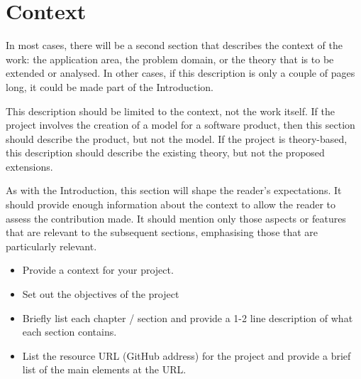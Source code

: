 \chapter{Context}
In most cases, there will be a second section that describes the context of the work: the application area, the problem domain, or the theory that is to be extended or analysed. In other cases, if this description is only a couple of pages long, it could be made part of the Introduction.

This description should be limited to the context, not the work itself. If the project involves the creation of a model for a software product, then this section should describe the product, but not the model. If the project is theory-based, this description should describe the existing theory, but not the proposed extensions.

As with the Introduction, this section will shape the reader's expectations. It should provide enough information about the context to allow the reader to assess the contribution made. It should mention only those aspects or features that are relevant to the subsequent sections, emphasising those that are particularly relevant.

\begin{itemize}
\item Provide a context for your project.
\item Set out the objectives of the project
\item Briefly list each chapter / section and provide a 1-2 line description of what each section contains.
\item List the resource URL (GitHub address) for the project and provide a brief list of the main elements at the URL.
\end{itemize}
